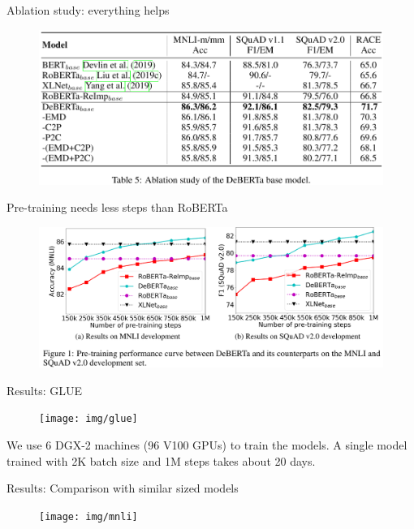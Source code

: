 \documentclass{beamer}
\begin{document}
\begin{frame}{Ablation study: everything helps}

\begin{figure}[h]
\includegraphics[width=\textwidth]{img/ablation}
\end{figure}

\end{frame}
\begin{frame}{Pre-training needs less steps than RoBERTa}

\begin{figure}[h]
\includegraphics[width=\textwidth]{img/pretraining}
\end{figure}

\end{frame}
\begin{frame}{Results: GLUE}

\begin{figure}[h]
\texttt{[image: img/glue]}
\end{figure}

We use 6 DGX-2 machines (96 V100 GPUs) to train the models. A single model trained with 2K batch size and 1M steps takes about 20 days.

\end{frame}
\begin{frame}{Results: Comparison with similar sized models}

\begin{figure}[h]
\texttt{[image: img/mnli]}
\end{figure}

\end{frame}
\end{document}
